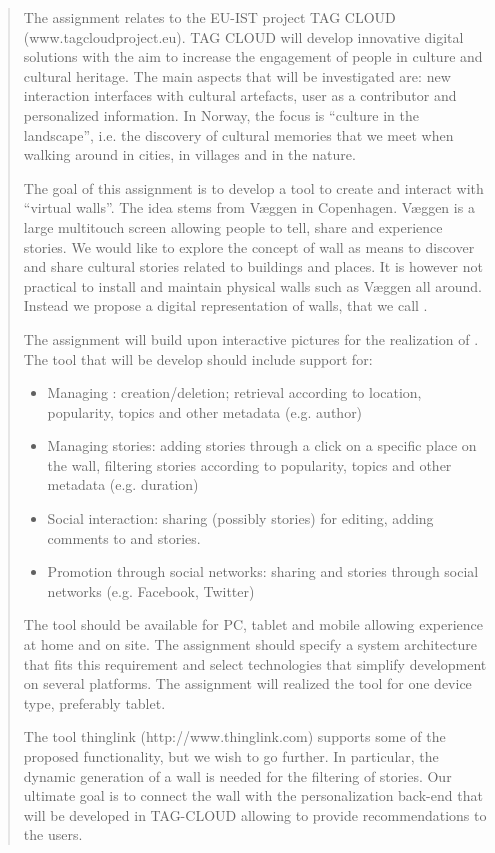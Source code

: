 \documentclass[11pt]{book}
\begin{document}
\begin{quotation}\noindent
The assignment relates to the EU-IST project TAG CLOUD (www.tagcloudproject.eu). TAG CLOUD will develop innovative digital solutions with the aim to increase the engagement of people in culture and cultural heritage. The main aspects that will be investigated are: new interaction interfaces with cultural artefacts, user as a contributor and personalized information. In Norway, the focus is ``culture in the landscape'', i.e. the discovery of cultural memories that we meet when walking around in cities, in villages and in the nature.

The goal of this assignment is to develop a tool to create and interact with ``virtual walls''. The idea stems from Væggen in Copenhagen. Væggen is a large multitouch screen allowing people to tell, share and experience stories. We would like to explore the concept of wall as means to discover and share cultural stories related to buildings and places. It is however not practical to install and maintain physical walls such as Væggen all around. Instead we propose a digital representation of walls, that we call \wallentitys.

The assignment will build upon interactive pictures for the realization of \wallentityp. The tool that will be develop should include support for:
\begin{itemize}
    \item Managing \wallentityp: creation/deletion; retrieval according to location, popularity, topics and other metadata (e.g. author)
    \item Managing stories: adding stories through a click on a specific place on the wall, filtering stories
according to popularity, topics and other metadata (e.g. duration)
    \item Social interaction: sharing \wallentityp (possibly stories) for editing, adding comments to \wallentityp and stories.
    \item Promotion through social networks: sharing \wallentityp and stories through social networks (e.g. Facebook, Twitter)
\end{itemize}
The tool should be available for PC, tablet and mobile allowing experience at home and on site. The assignment should specify a system architecture that fits this requirement and select technologies that simplify development on several platforms. The assignment will realized the tool for one device type, preferably tablet.

The tool thinglink (http://www.thinglink.com) supports some of the proposed functionality, but we wish to go further. In particular, the dynamic generation of a wall is needed for the filtering of stories. Our ultimate goal is to connect the wall with the personalization back-end that will be developed in TAG-CLOUD allowing to provide recommendations to the users.


\end{quotation}
\end{document}
